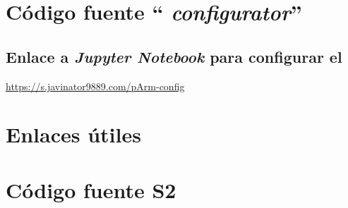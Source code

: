 \chapter{Código fuente ``\pArm{} \textit{configurator}''}
\label{anex:pArm-configurator}


\section{Enlace a \textit{Jupyter Notebook} para configurar el \pArm}
\label{anex:jupyter_binder}
\url{https://s.javinator9889.com/pArm-config}\qquad
{}

\chapter{Enlaces útiles}

\chapter{Código fuente S2}
\label{anex:source_code}
